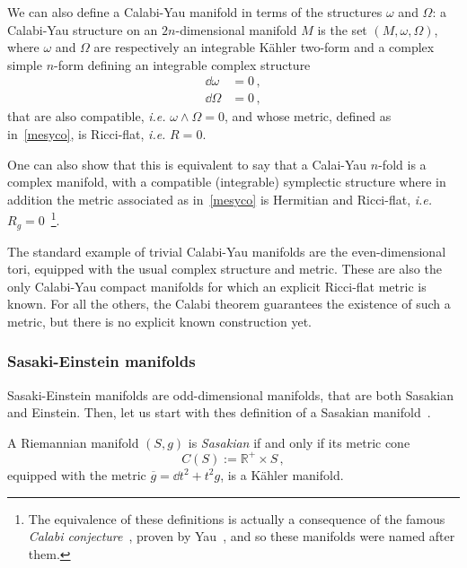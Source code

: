 \documentclass[debug]{phd}
\begin{document}
We can also define a Calabi-Yau manifold in terms of the structures $\omega$ and $\Omega$: a Calabi-Yau structure on an $2n$-dimensional manifold $M$ is the set $(M, \omega, \Omega)$, where $\omega$ and $\Omega$ are respectively an integrable K\"ahler two-form and a complex simple $n$-form defining an integrable complex structure
							\begin{align*}
								\dd \omega 	&= 0 \, , \\
								\dd \Omega	&= 0 \, ,
							\end{align*}
that are also compatible, \emph{i.e.} $\omega \wedge \Omega = 0$, and whose metric, defined as in~\eqref{mesyco}, is Ricci-flat, \emph{i.e.} $R = 0$.

One can also show that this is equivalent to say that a Calai-Yau $n$-fold is a complex manifold, with a compatible (integrable) symplectic structure where in addition the metric associated as in~\eqref{mesyco} is Hermitian and Ricci-flat, \emph{i.e.} $R_g = 0$~\cite{joyce, KahlBook}\footnote{%
						The equivalence of these definitions is actually a consequence of the famous \emph{Calabi conjecture}~\cite{CalabiMetr}, proven by Yau~\cite{YauCalabi}, and so these manifolds were named after them.}.
						
					The standard example of trivial Calabi-Yau manifolds are the even-dimensional tori, equipped with the usual complex structure and metric.
					These are also the only Calabi-Yau compact manifolds for which an explicit Ricci-flat metric is known.
					For all the others, the Calabi theorem guarantees the existence of such a metric, but there is no explicit known construction yet.

							

				\subsubsection{Sasaki-Einstein manifolds}
					Sasaki-Einstein manifolds are odd-dimensional manifolds, that are both Sasakian and Einstein.
					Then, let us start with thes definition of a Sasakian manifold~\cite{SparksSE}.

					A Riemannian manifold $(S,g)$ is \emph{Sasakian} if and only if its metric cone
											\begin{equation*}
												C(S) := \mathbb{R}^+ \times S \, ,
											\end{equation*}
					equipped with the metric $\overline{g} = \dd t^2 + t^2 g$, is a K\"ahler manifold.
					
\end{document}
